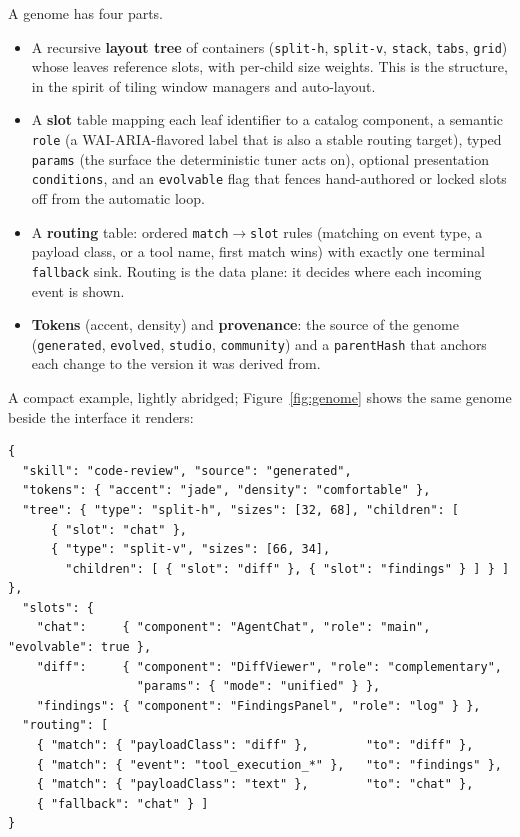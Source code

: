 \documentclass[11pt]{article}
\begin{document}
A genome has four parts.

\begin{itemize}[leftmargin=1.4em,itemsep=2pt]
  \item A recursive \textbf{layout tree} of containers
  (\texttt{split-h}, \texttt{split-v}, \texttt{stack}, \texttt{tabs},
  \texttt{grid}) whose leaves reference slots, with per-child size weights. This
  is the structure, in the spirit of tiling window managers and auto-layout.
  \item A \textbf{slot} table mapping each leaf identifier to a catalog component,
  a semantic \texttt{role} (a WAI-ARIA-flavored label that is also a stable
  routing target), typed \texttt{params} (the surface the deterministic tuner
  acts on), optional presentation \texttt{conditions}, and an \texttt{evolvable}
  flag that fences hand-authored or locked slots off from the automatic loop.
  \item A \textbf{routing} table: ordered \texttt{match$\rightarrow$slot} rules
  (matching on event type, a payload class, or a tool name, first match wins)
  with exactly one terminal \texttt{fallback} sink. Routing is the data plane: it
  decides where each incoming event is shown.
  \item \textbf{Tokens} (accent, density) and \textbf{provenance}: the source of
  the genome (\texttt{generated}, \texttt{evolved}, \texttt{studio},
  \texttt{community}) and a \texttt{parentHash} that anchors each change to the
  version it was derived from.
\end{itemize}

A compact example, lightly abridged; Figure~\ref{fig:genome} shows the same
genome beside the interface it renders:

\begin{footnotesize}
\begin{verbatim}
{
  "skill": "code-review", "source": "generated",
  "tokens": { "accent": "jade", "density": "comfortable" },
  "tree": { "type": "split-h", "sizes": [32, 68], "children": [
      { "slot": "chat" },
      { "type": "split-v", "sizes": [66, 34],
        "children": [ { "slot": "diff" }, { "slot": "findings" } ] } ] },
  "slots": {
    "chat":     { "component": "AgentChat", "role": "main", "evolvable": true },
    "diff":     { "component": "DiffViewer", "role": "complementary",
                  "params": { "mode": "unified" } },
    "findings": { "component": "FindingsPanel", "role": "log" } },
  "routing": [
    { "match": { "payloadClass": "diff" },        "to": "diff" },
    { "match": { "event": "tool_execution_*" },   "to": "findings" },
    { "match": { "payloadClass": "text" },        "to": "chat" },
    { "fallback": "chat" } ]
}
\end{verbatim}
\end{footnotesize}
\end{document}
